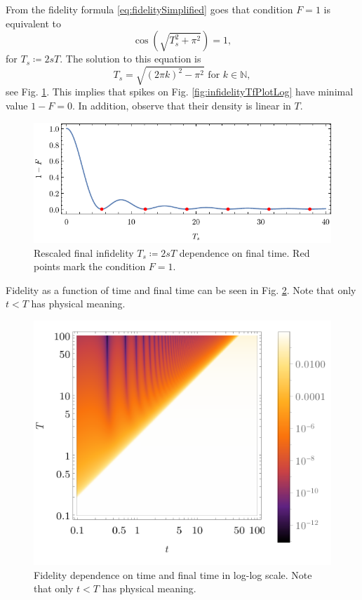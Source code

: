 From the fidelity formula \ref{eq:fidelitySimplified} goes that condition $F=1$ is equivalent to
\begin{equation}
    \cos \left(\sqrt{T_s^2+\pi ^2}\right)=1,
\end{equation}
for $T_s\coloneqq 2s T$. The solution to this equation is
\begin{equation}
    T_s=\sqrt{(2 \pi  k)^2-\pi ^2} \text{  for }k\in \mathbb{N},
    \label{eq:solutionT}
\end{equation}
see Fig. \ref{fig:fidelityZeros}. This implies that spikes on Fig. \ref{fig:infidelityTfPlotLog} have minimal value $1-F=0$. In addition, observe that their density is linear in $T$.
\begin{figure}[H]
    \centering
    \includegraphics[scale=1.2]{../img/fidelityZeros.pdf}
    \caption{Rescaled final infidelity $T_s\coloneqq 2s T$ dependence on final time. Red points mark the condition $F=1$.}
    \label{fig:fidelityZeros}
\end{figure}


Fidelity as a function of time and final time can be seen in Fig. \ref{fig:dens3}. Note that only $t<T$ has physical meaning.

\begin{figure}[H]
    \centering
    \includegraphics[scale=1.2]{../img/dens3.pdf}
    \caption{Fidelity dependence on time and final time in log-log scale. Note that only $t<T$ has physical meaning.}
    \label{fig:dens3}
\end{figure}


